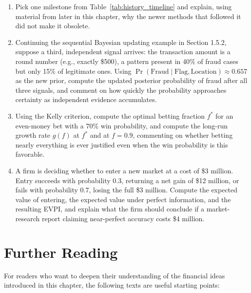 \documentclass[../ai_in_finance]{subfiles}
\begin{document}
\begin{enumerate}
    \item Pick one milestone from Table~\ref{tab:history_timeline} and explain, using material from later in this chapter, why the newer methods that followed it did not make it obsolete.
    \item Continuing the sequential Bayesian updating example in Section 1.5.2, suppose a third, independent signal arrives: the transaction amount is a round number (e.g., exactly \$500), a pattern present in 40\% of fraud cases but only 15\% of legitimate ones. Using $\Pr(\text{Fraud}\mid\text{Flag},\text{Location}) \approx 0.657$ as the new prior, compute the updated posterior probability of fraud after all three signals, and comment on how quickly the probability approaches certainty as independent evidence accumulates.
    \item Using the Kelly criterion, compute the optimal betting fraction $f^*$ for an even-money bet with a $70\%$ win probability, and compute the long-run growth rate $g(f)$ at $f^*$ and at $f=0.9$, commenting on whether betting nearly everything is ever justified even when the win probability is this favorable.
    \item A firm is deciding whether to enter a new market at a cost of \$3 million. Entry succeeds with probability $0.3$, returning a net gain of \$12 million, or fails with probability $0.7$, losing the full \$3 million. Compute the expected value of entering, the expected value under perfect information, and the resulting EVPI, and explain what the firm should conclude if a market-research report claiming near-perfect accuracy costs \$4 million.
\end{enumerate}

\section{Further Reading}

For readers who want to deepen their understanding of the financial ideas introduced in this chapter, the following texts are useful starting points:
\end{document}
